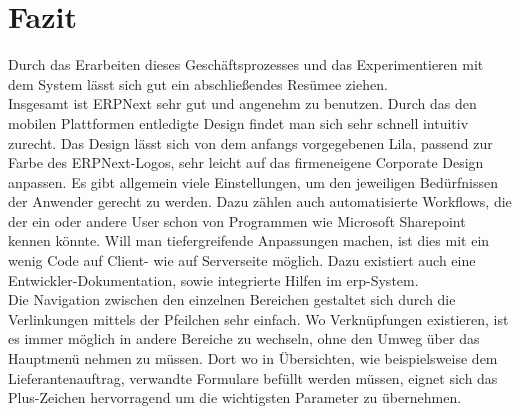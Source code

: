 \section{Fazit}
Durch das Erarbeiten dieses Geschäftsprozesses und das Experimentieren mit dem System lässt sich gut ein abschließendes Resümee ziehen. \\
Insgesamt ist ERPNext sehr gut und angenehm zu benutzen. Durch das den mobilen Plattformen entledigte Design findet man sich sehr schnell intuitiv zurecht. Das Design lässt sich von dem anfangs vorgegebenen Lila, passend zur Farbe des ERPNext-Logos, sehr leicht auf das firmeneigene Corporate Design anpassen. Es gibt allgemein viele Einstellungen, um den jeweiligen Bedürfnissen der Anwender gerecht zu werden. Dazu zählen auch automatisierte Workflows, die der ein oder andere User schon von Programmen wie Microsoft Sharepoint kennen könnte. Will man tiefergreifende Anpassungen machen, ist dies mit ein wenig Code auf Client- wie auf Serverseite möglich. Dazu existiert auch eine Entwickler-Dokumentation, sowie integrierte Hilfen im \gls{erp}-System. \\
Die Navigation zwischen den einzelnen Bereichen gestaltet sich durch die Verlinkungen mittels der Pfeilchen sehr einfach. Wo Verknüpfungen existieren, ist es immer möglich in andere Bereiche zu wechseln, ohne den Umweg über das Hauptmenü nehmen zu müssen. Dort wo in Übersichten, wie beispielsweise dem Lieferantenauftrag, verwandte Formulare befüllt werden müssen, eignet sich das Plus-Zeichen hervorragend um die wichtigsten Parameter zu übernehmen.


